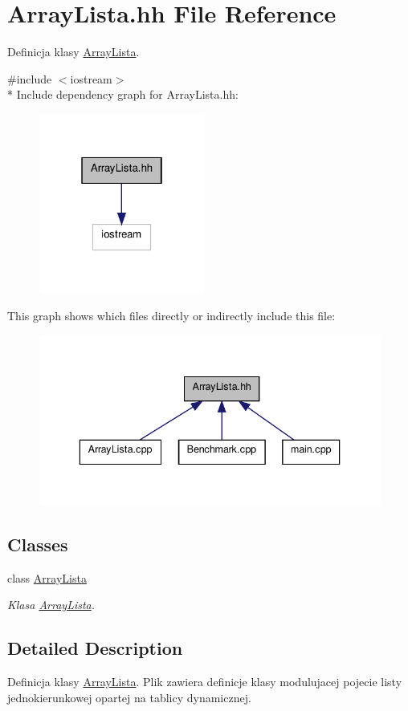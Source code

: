 \hypertarget{a00007}{\section{Array\-Lista.\-hh File Reference}
\label{a00007}
}


Definicja klasy \hyperlink{a00001}{Array\-Lista}.  


{\ttfamily \#include $<$iostream$>$}\\*
Include dependency graph for Array\-Lista.\-hh\-:\nopagebreak
\begin{figure}[H]
\begin{center}
\leavevmode
\includegraphics[width=154pt]{a00020}
\end{center}
\end{figure}
This graph shows which files directly or indirectly include this file\-:\nopagebreak
\begin{figure}[H]
\begin{center}
\leavevmode
\includegraphics[width=336pt]{a00021}
\end{center}
\end{figure}
\subsection*{Classes}
\begin{DoxyCompactItemize}
\item 
class \hyperlink{a00001}{Array\-Lista}
\begin{DoxyCompactList}\small\item\em Klasa \hyperlink{a00001}{Array\-Lista}. \end{DoxyCompactList}\end{DoxyCompactItemize}


\subsection{Detailed Description}
Definicja klasy \hyperlink{a00001}{Array\-Lista}. Plik zawiera definicje klasy modulujacej pojecie listy jednokierunkowej opartej na tablicy dynamicznej. 